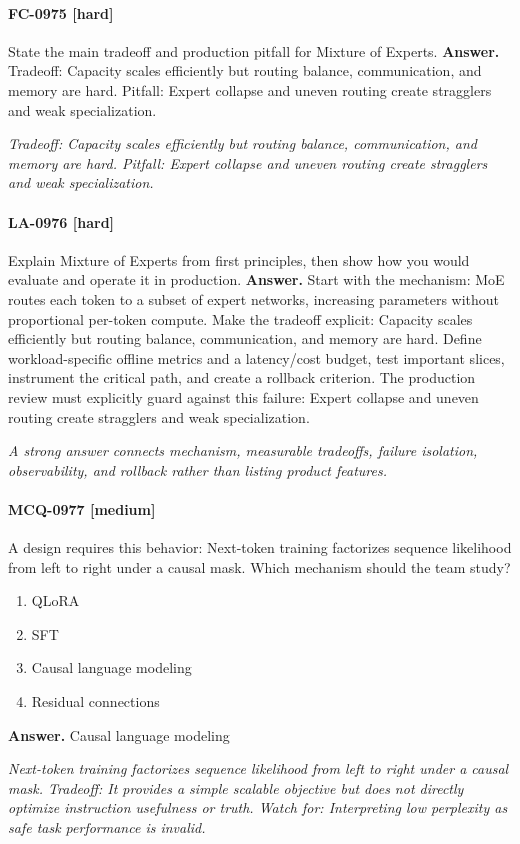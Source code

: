 \paragraph{FC-0975 [hard]} State the main tradeoff and production pitfall for Mixture of Experts.
\noindent\textbf{Answer.} Tradeoff: Capacity scales efficiently but routing balance, communication, and memory are hard. Pitfall: Expert collapse and uneven routing create stragglers and weak specialization.
\par\textit{Tradeoff: Capacity scales efficiently but routing balance, communication, and memory are hard. Pitfall: Expert collapse and uneven routing create stragglers and weak specialization.}
\paragraph{LA-0976 [hard]} Explain Mixture of Experts from first principles, then show how you would evaluate and operate it in production.
\noindent\textbf{Answer.} Start with the mechanism: MoE routes each token to a subset of expert networks, increasing parameters without proportional per-token compute. Make the tradeoff explicit: Capacity scales efficiently but routing balance, communication, and memory are hard. Define workload-specific offline metrics and a latency/cost budget, test important slices, instrument the critical path, and create a rollback criterion. The production review must explicitly guard against this failure: Expert collapse and uneven routing create stragglers and weak specialization.
\par\textit{A strong answer connects mechanism, measurable tradeoffs, failure isolation, observability, and rollback rather than listing product features.}
\paragraph{MCQ-0977 [medium]} A design requires this behavior: Next-token training factorizes sequence likelihood from left to right under a causal mask. Which mechanism should the team study?
\begin{enumerate}[label=\Alph*.]
\item QLoRA
\item SFT
\item Causal language modeling
\item Residual connections
\end{enumerate}
\noindent\textbf{Answer.} Causal language modeling
\par\textit{Next-token training factorizes sequence likelihood from left to right under a causal mask. Tradeoff: It provides a simple scalable objective but does not directly optimize instruction usefulness or truth. Watch for: Interpreting low perplexity as safe task performance is invalid.}
